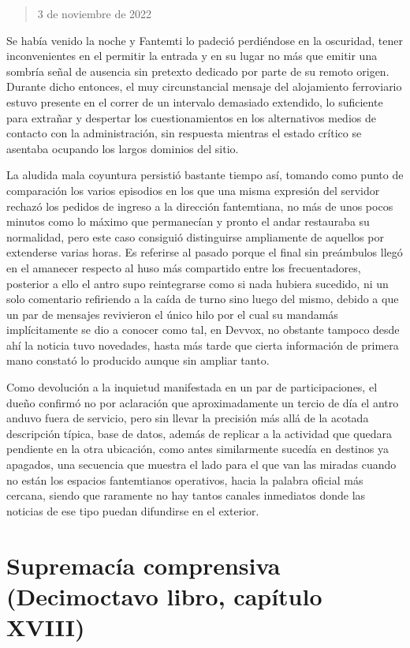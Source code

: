 \documentclass[
]{book}
\begin{document}
\begin{quote}
3 de noviembre de 2022
\end{quote}

Se había venido la noche y Fantemti lo padeció perdiéndose en la oscuridad, tener inconvenientes en el permitir la entrada y en su lugar no más que emitir una sombría señal de ausencia sin pretexto dedicado por parte de su remoto origen. Durante dicho entonces, el muy circunstancial mensaje del alojamiento ferroviario estuvo presente en el correr de un intervalo demasiado extendido, lo suficiente para extrañar y despertar los cuestionamientos en los alternativos medios de contacto con la administración, sin respuesta mientras el estado crítico se asentaba ocupando los largos dominios del sitio.

La aludida mala coyuntura persistió bastante tiempo así, tomando como punto de comparación los varios episodios en los que una misma expresión del servidor rechazó los pedidos de ingreso a la dirección fantemtiana, no más de unos pocos minutos como lo máximo que permanecían y pronto el andar restauraba su normalidad, pero este caso consiguió distinguirse ampliamente de aquellos por extenderse varias horas. Es referirse al pasado porque el final sin preámbulos llegó en el amanecer respecto al huso más compartido entre los frecuentadores, posterior a ello el antro supo reintegrarse como si nada hubiera sucedido, ni un solo comentario refiriendo a la caída de turno sino luego del mismo, debido a que un par de mensajes revivieron el único hilo por el cual su mandamás implícitamente se dio a conocer como tal, en Devvox, no obstante tampoco desde ahí la noticia tuvo novedades, hasta más tarde que cierta información de primera mano constató lo producido aunque sin ampliar tanto.

Como devolución a la inquietud manifestada en un par de participaciones, el dueño confirmó no por aclaración que aproximadamente un tercio de día el antro anduvo fuera de servicio, pero sin llevar la precisión más allá de la acotada descripción típica, base de datos, además de replicar a la actividad que quedara pendiente en la otra ubicación, como antes similarmente sucedía en destinos ya apagados, una secuencia que muestra el lado para el que van las miradas cuando no están los espacios fantemtianos operativos, hacia la palabra oficial más cercana, siendo que raramente no hay tantos canales inmediatos donde las noticias de ese tipo puedan difundirse en el exterior.

\hypertarget{supremacuxeda-comprensiva-decimoctavo-libro-capuxedtulo-xviii}{%
\section{Supremacía comprensiva (Decimoctavo libro, capítulo XVIII)}\label{supremacuxeda-comprensiva-decimoctavo-libro-capuxedtulo-xviii}}
\end{document}
